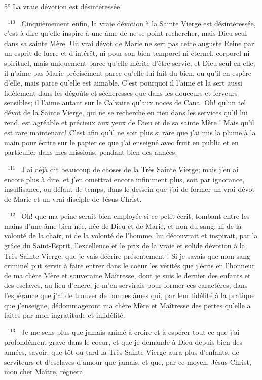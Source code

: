 \documentclass[paper=a5,pagesize=pdftex,fontsize=15pt,headinclude=on,twoside=off]{scrbook}
\newcommand{\negphantom}[1]{\settowidth{\dimen0}{#1}\hspace*{-\dimen0}}
\newcommand{\versenb}[1]{\par \vspace{10pt}~\negphantom{~${}^{#1}$~}${}^{#1}$~}
\begin{document}
5° La vraie dévotion est désintéressée.
\versenb{110} Cinquièmement enfin, la vraie dévotion à la Sainte Vierge est désintéressée, c'est-à-dire qu'elle inspire à une
âme de ne se point rechercher, mais Dieu seul dans sa sainte Mère. Un vrai dévot de Marie ne sert pas cette
auguste Reine par un esprit de lucre et d'intérêt, ni pour son bien temporel ni éternel, corporel ni spirituel, mais
uniquement parce qu'elle mérite d'être servie, et Dieu seul en elle; il n'aime pas Marie précisément parce qu'elle lui
fait du bien, ou qu'il en espère d'elle, mais parce qu'elle est aimable. C'est pourquoi il l'aime et la sert aussi
fidèlement dans les dégoûts et sécheresses que dans les douceurs et ferveurs sensibles; il l'aime autant sur le
Calvaire qu'aux noces de Cana. Oh! qu'un tel dévot de la Sainte Vierge, qui ne se recherche en rien dans les
services qu'il lui rend, est agréable et précieux aux yeux de Dieu et de sa sainte Mère ! Mais qu'il est rare
maintenant! C'est afin qu'il ne soit plus si rare que j'ai mis la plume à la main pour écrire sur le papier ce que j'ai
enseigné avec fruit en public et en particulier dans mes missions, pendant bien des années.
\versenb{111} J'ai déjà dit beaucoup de choses de la Très Sainte Vierge; mais j'en ai encore plus à dire, et j'en omettrai
encore infiniment plus, soit par ignorance, insuffisance, ou défaut de temps, dans le dessein que j'ai de former un
vrai dévot de Marie et un vrai disciple de Jésus-Christ.
\versenb{112} Oh! que ma peine serait bien employée si ce petit écrit, tombant entre les mains d'une âme bien née, née de
Dieu et de Marie, et non du sang, ni de la volonté de la chair, ni de la volonté de l'homme, lui découvrait et
inspirait, par la grâce du Saint-Esprit, l'excellence et le prix de la vraie et solide dévotion à la Très Sainte Vierge,
que je vais décrire présentement ! Si je savais que mon sang criminel put servir à faire entrer dans le coeur les
vérités que j'écris en l'honneur
de ma chère Mère et souveraine Maîtresse, dont je suis le dernier des enfants et des esclaves, au lieu d'encre, je
m'en servirais pour former ces caractères, dans l'espérance que j'ai de trouver de bonnes âmes qui, par leur
fidélité à la pratique que j'enseigne, dédommageront ma chère Mère et Maîtresse des pertes qu'elle a faites par
mon ingratitude et infidélité.
\versenb{113} Je me sens plus que jamais animé à croire et à espérer tout ce que j'ai profondément gravé dans le coeur, et
que je demande à Dieu depuis bien des années, savoir: que tôt ou tard la Très Sainte Vierge aura plus d'enfants,
de serviteurs et d'esclaves d'amour que jamais, et que, par ce moyen, Jésus-Christ, mon cher Maître, régnera
\end{document}

